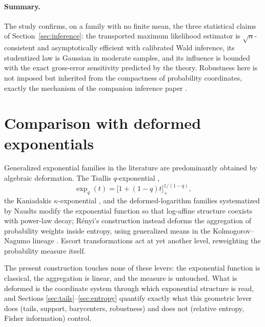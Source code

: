 \documentclass[11pt]{article}
\theoremstyle{definition}
\begin{document}
\paragraph{Summary.}
The study confirms, on a family with no finite mean, the three statistical
claims of Section~\ref{sec:inference}: the transported maximum likelihood
estimator is $\sqrt n$-consistent and asymptotically efficient with
calibrated Wald inference, its studentized law is Gaussian in moderate
samples, and its influence is bounded with the exact gross-error
sensitivity predicted by the theory. Robustness here is not imposed but
inherited from the compactness of probability coordinates, exactly the
mechanism of the companion inference paper \cite{Cojocea2026b}.

\section{Comparison with deformed exponentials}
\label{sec:deformed}

Generalized exponential families in the literature are predominantly
obtained by algebraic deformation. The Tsallis $q$-exponential
\cite{Tsallis1988},
\[
\exp_q(t)=\bigl[1+(1-q)t\bigr]_+^{1/(1-q)},
\]
the Kaniadakis $\kappa$-exponential \cite{Kaniadakis2002}, and the
deformed-logarithm families systematized by Naudts \cite{Naudts2011}
modify the exponential function so that log-affine structure coexists with
power-law decay; R\'enyi's construction \cite{Renyi1961} instead deforms
the aggregation of probability weights inside entropy, using generalized
means in the Kolmogorov--Nagumo lineage \cite{Kolmogorov1930,Nagumo1930}.
Escort transformations \cite{Tsallis1988} act at yet another level,
reweighting the probability measure itself.

The present construction touches none of these levers: the exponential
function is classical, the aggregation is linear, and the measure is
untouched. What is deformed is the coordinate system through which
exponential structure is read, and Sections
\ref{sec:tails}--\ref{sec:entropy} quantify exactly what this geometric
lever does (tails, support, barycenters, robustness) and does not
(relative entropy, Fisher information) control.
\end{document}
